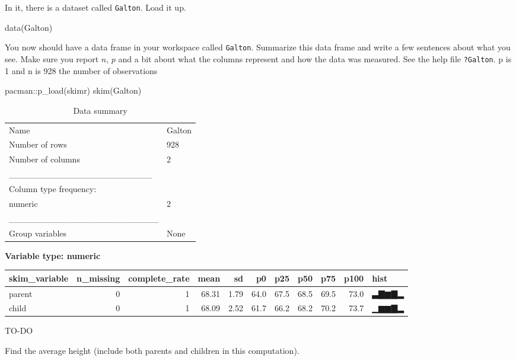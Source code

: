 \documentclass[
]{article}
\newenvironment{Shaded}{\begin{snugshade}}{\end{snugshade}}
\newcommand{\FunctionTok}[1]{\textcolor[rgb]{0.00,0.00,0.00}{#1}}
\newcommand{\NormalTok}[1]{#1}
\newcommand{\OtherTok}[1]{\textcolor[rgb]{0.56,0.35,0.01}{#1}}
\newcommand{\SpecialCharTok}[1]{\textcolor[rgb]{0.00,0.00,0.00}{#1}}
\begin{document}
In it, there is a dataset called \texttt{Galton}. Load it up.

\begin{Shaded}
\begin{Highlighting}[]
\FunctionTok{data}\NormalTok{(Galton)}
\end{Highlighting}
\end{Shaded}

You now should have a data frame in your workspace called
\texttt{Galton}. Summarize this data frame and write a few sentences
about what you see. Make sure you report \(n\), \(p\) and a bit about
what the columns represent and how the data was measured. See the help
file \texttt{?Galton}. p is 1 and n is 928 the number of observations

\begin{Shaded}
\begin{Highlighting}[]
\NormalTok{pacman}\SpecialCharTok{::}\FunctionTok{p\_load}\NormalTok{(skimr)}
\FunctionTok{skim}\NormalTok{(Galton)}
\end{Highlighting}
\end{Shaded}

\begin{longtable}[]{@{}ll@{}}
\caption{Data summary}\tabularnewline
\toprule
\endhead
Name & Galton\tabularnewline
Number of rows & 928\tabularnewline
Number of columns & 2\tabularnewline
\_\_\_\_\_\_\_\_\_\_\_\_\_\_\_\_\_\_\_\_\_\_\_ &\tabularnewline
Column type frequency: &\tabularnewline
numeric & 2\tabularnewline
\_\_\_\_\_\_\_\_\_\_\_\_\_\_\_\_\_\_\_\_\_\_\_\_ &\tabularnewline
Group variables & None\tabularnewline
\bottomrule
\end{longtable}

\textbf{Variable type: numeric}

\begin{longtable}[]{@{}lrrrrrrrrrl@{}}
\toprule
skim\_variable & n\_missing & complete\_rate & mean & sd & p0 & p25 &
p50 & p75 & p100 & hist\tabularnewline
\midrule
\endhead
parent & 0 & 1 & 68.31 & 1.79 & 64.0 & 67.5 & 68.5 & 69.5 & 73.0 &
▃▇▆▇▂\tabularnewline
child & 0 & 1 & 68.09 & 2.52 & 61.7 & 66.2 & 68.2 & 70.2 & 73.7 &
▁▆▆▇▂\tabularnewline
\bottomrule
\end{longtable}

TO-DO

Find the average height (include both parents and children in this
computation).

\begin{Shaded}
\end{Shaded}
\end{document}
